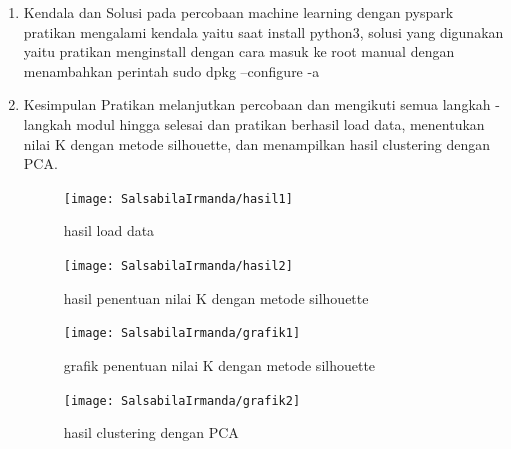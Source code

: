 \begin{enumerate}
\item Kendala dan Solusi
\newline pada percobaan machine learning dengan pyspark pratikan mengalami kendala yaitu saat install python3, solusi yang digunakan yaitu pratikan menginstall dengan cara masuk ke root manual dengan menambahkan perintah sudo dpkg --configure -a

\item Kesimpulan
\newline Pratikan melanjutkan percobaan dan mengikuti semua langkah - langkah modul hingga selesai dan pratikan berhasil load data, menentukan nilai K dengan metode silhouette, dan menampilkan hasil clustering dengan PCA.
\begin{figure}[!ht]
\texttt{[image: SalsabilaIrmanda/hasil1]}
\caption{hasil load data}
\label{gam:hasil}
\end{figure}

\begin{figure}[!ht]
\texttt{[image: SalsabilaIrmanda/hasil2]}
\caption{hasil penentuan nilai K dengan metode silhouette}
\label{gam:hasil}
\end{figure}

\begin{figure}[!ht]
\texttt{[image: SalsabilaIrmanda/grafik1]}
\caption{grafik penentuan nilai K dengan metode silhouette}
\label{gam:hasil}
\end{figure}

\newpage
\begin{figure}[!ht]
\texttt{[image: SalsabilaIrmanda/grafik2]}
\caption{hasil clustering dengan PCA}
\label{gam:hasil}
\end{figure}
\end{enumerate}

